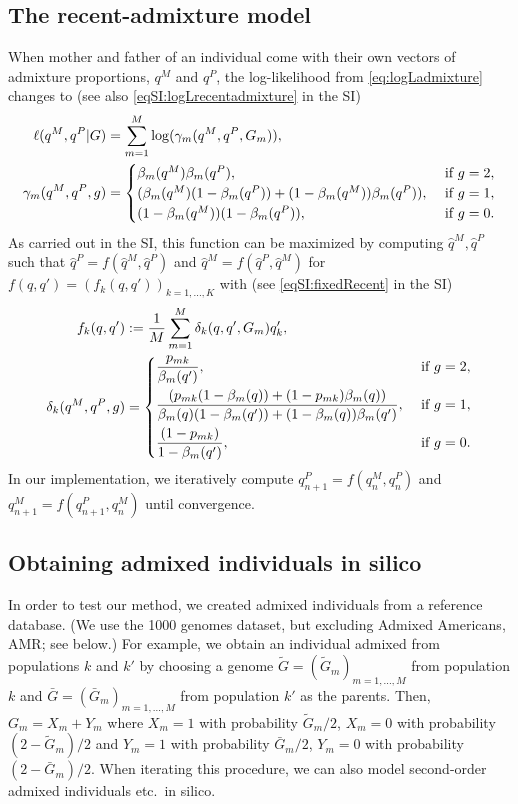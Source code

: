 \documentclass[12pt]{article}
\theoremstyle{definition}
\begin{document}
\subsection{The recent-admixture model}
When mother and father of an individual come with their own vectors of
admixture proportions, $q^M$ and $q^P$, the log-likelihood from
\eqref{eq:logLadmixture} changes to (see also
\eqref{eqSI:logLrecentadmixture} in the SI)
\begin{align}\label{eq:logLrecentadmixture}
  \ell(q^M, q^P|G) & = \sum_{m=1}^M \log( \gamma_m(q^M, q^P, G_m)),
  \\
  \notag
  \gamma_m(q^M, q^P, g) & = \begin{cases}\beta_m(q^M) \beta_m(q^P), & \text{ if }g=2,\\
    (\beta_m(q^M) (1-\beta_m(q^P))
    + (1-\beta_m(q^M)) \beta_m(q^P)), & \text{ if }g=1,\\
    (1-\beta_m(q^M))(1-\beta_m(q^P)), & \text{ if }g=0. \end{cases}
\end{align}
\sloppy As carried out in the SI, this function can be maximized by
computing $\hat q^M, \hat q^P$ such that
$\hat q^P = f(\hat q^M, \hat q^P)$ and
$\hat q^M = f(\hat q^P, \hat q^M)$ for
$f(q,q') = (f_k(q, q'))_{k=1,...,K}$ with (see
\eqref{eqSI:fixedRecent} in the SI)
\begin{align}\label{eq:fixedRecent}
  f_k(q, q') & := \frac{1}{M}\sum_{m=1}^M \delta_k(q,q', G_m) q_k',
  \\
  \notag
  \delta_k(q^M, q^P, g) & = \begin{cases}
    \displaystyle\frac{p_{mk}}{\beta_m(q')}, & \text{ if }g=2,\\[2ex]
    \displaystyle\frac{(p_{mk} (1-\beta_m(q))
      + (1-p_{mk})\beta_m(q))}{\beta_m(q)(1-\beta_m(q'))
      + (1-\beta_m(q))\beta_m(q')}, & \text{ if }g=1,\\[2ex]
    \displaystyle\frac{(1-p_{mk})}{1-\beta_m(q')}, & \text{ if }g=0. \end{cases}
\end{align}
In our implementation, we iteratively compute
$q_{n+1}^P = f(q_n^M, q_n^P)$ and $q_{n+1}^M = f(q_{n+1}^P, q_n^M)$
until convergence.

\subsection{Obtaining admixed individuals in silico}
\label{S:insilico}
In order to test our method, we created admixed individuals from a
reference database. (We use the 1000 genomes dataset, but excluding
Admixed Americans, AMR; see below.) For example, we obtain an
individual admixed from populations $k$ and $k'$ by choosing a genome
$\tilde G = (\tilde G_m)_{m=1,...,M}$ from population $k$ and
$\bar G = (\bar G_m)_{m=1,...,M}$ from population $k'$ as the
parents. Then, $G_m = X_m + Y_m$ where $X_m = 1$ with probability
$\tilde G_m/2$, $X_m=0$ with probability $(2-\tilde G_m)/2$ and
$Y_m = 1$ with probability $\bar G_m/2$, $Y_m=0$ with probability
$(2-\bar G_m)/2$. When iterating this procedure, we can also model
second-order admixed individuals etc.\ in silico.
\end{document}
